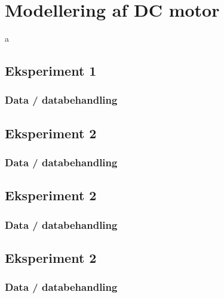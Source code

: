 \section{Modellering af DC motor}
\label{app:modellering_af_DC_motor}
a

\subsection{Eksperiment 1}
\subsubsection{Data / databehandling}

\subsection{Eksperiment 2}
\subsubsection{Data / databehandling}


\subsection{Eksperiment 2}
\subsubsection{Data / databehandling}

\subsection{Eksperiment 2}
\subsubsection{Data / databehandling}